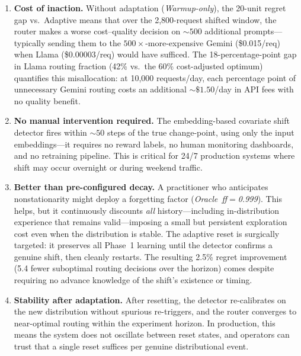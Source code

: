 \begin{enumerate}[leftmargin=*,noitemsep]
  \item \textbf{Cost of inaction.}
        Without adaptation (\emph{Warmup-only}), the 20-unit regret
        gap vs.\ Adaptive means that over the 2{,}800-request shifted
        window, the router makes a worse cost--quality decision on
        ${\sim}500$ additional prompts---typically sending them to
        the $500{\times}$-more-expensive Gemini (\$0.015/req) when
        Llama (\$0.00003/req) would have sufficed.
        The 18-percentage-point gap in Llama routing fraction
        (42\% vs.\ the 60\% cost-adjusted optimum) quantifies this
        misallocation: at 10{,}000 requests/day, each percentage
        point of unnecessary Gemini routing costs an additional
        ${\sim}\$1.50$/day in API fees with no quality benefit.

  \item \textbf{No manual intervention required.}
        The embedding-based covariate shift detector fires within
        ${\sim}50$ steps of the true change-point, using only the
        input embeddings---it requires no reward labels, no human
        monitoring dashboards, and no retraining pipeline.
        This is critical for 24/7 production systems where shift may
        occur overnight or during weekend traffic.

  \item \textbf{Better than pre-configured decay.}
        A practitioner who anticipates nonstationarity might deploy a
        forgetting factor (\emph{Oracle~ff$=$0.999}).  This helps, but
        it continuously discounts \emph{all} history---including
        in-distribution experience that remains valid---imposing a
        small but persistent exploration cost even when the
        distribution is stable.
        The adaptive reset is surgically targeted: it preserves all
        Phase~1 learning until the detector confirms a genuine shift,
        then cleanly restarts.  The resulting 2.5\% regret improvement
        (5.4 fewer suboptimal routing decisions over the horizon)
        comes despite requiring no advance knowledge of the shift's
        existence or timing.

  \item \textbf{Stability after adaptation.}
        After resetting, the detector re-calibrates on the new
        distribution without spurious re-triggers, and the router
        converges to near-optimal routing within the experiment
        horizon.  In production, this means the system does not
        oscillate between reset states, and operators can trust
        that a single reset suffices per genuine distributional event.


\end{enumerate}
